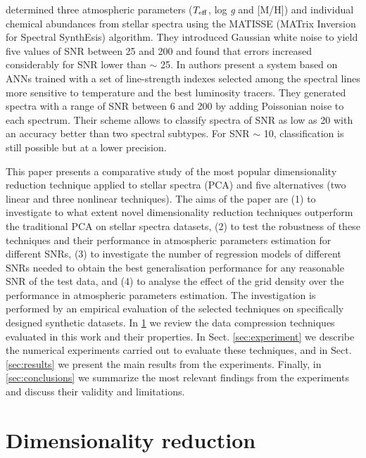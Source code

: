 \documentclass[a4paper,fleqn,usenatbib]{mnras}
\begin{document}

\cite{recio:06} determined three atmospheric parameters
($T_{\rm eff}$, log \textit{g} and [M/H]) and individual chemical
abundances from stellar spectra using the MATISSE (MATrix
Inversion for Spectral SynthEsis) algorithm. They introduced Gaussian
white noise to yield five values of SNR between 25 and 200 and found
that errors increased considerably for SNR lower than $\sim$ 25.  In
\cite{navarro:12} authors present a system based on ANNs trained with
a set of line-strength indexes selected among the spectral lines more
sensitive to temperature and the best luminosity tracers. They
generated spectra with a range of SNR between 6 and 200 by adding
Poissonian noise to each spectrum. Their scheme allows to classify
spectra of SNR as low as 20 with an accuracy better than two spectral
subtypes. For SNR $\sim$ 10, classification is still possible but at a
lower precision.

This paper presents a comparative study of the most popular
dimensionality reduction technique applied to stellar spectra (PCA)
and five alternatives (two linear and three nonlinear
techniques). The aims of the paper are (1) to investigate to what
extent novel dimensionality reduction techniques outperform the
traditional PCA on stellar spectra datasets, (2) to test the
robustness of these techniques and their performance in atmospheric
parameters estimation for different SNRs, (3) to investigate the
number of regression models of different SNRs needed to obtain the
best generalisation performance for any reasonable SNR of the test
data, and (4) to analyse the effect of the grid density over the 
performance in atmospheric parameters estimation.  
The investigation is performed by an empirical evaluation of
the selected techniques on specifically designed synthetic
datasets. In \ref{sec:dimred} we review the data compression
techniques evaluated in this work and their properties. In
Sect. \ref{sec:experiment} we describe the numerical experiments
carried out to evaluate these techniques, and in
Sect. \ref{sec:results} we present the main results from the
experiments. Finally, in \ref{sec:conclusions} we summarize the most
relevant findings from the experiments and discuss their validity
and limitations.

\section{Dimensionality reduction}
\label{sec:dimred}
\end{document}
